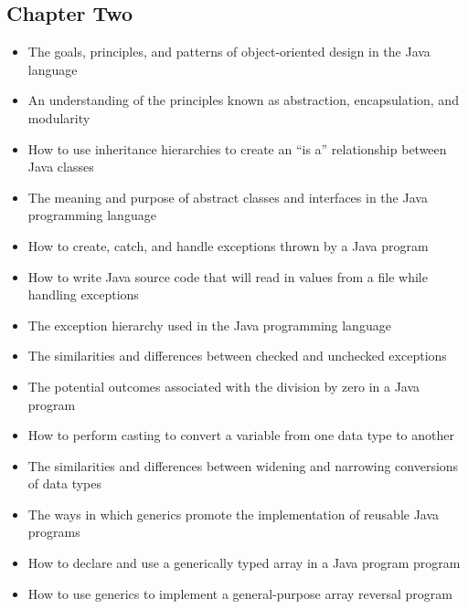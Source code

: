 \documentclass[11pt]{article}
\begin{document}
\vspace*{-.2in}
\subsection*{Chapter Two}

\begin{itemize}

  \item The goals, principles, and patterns of object-oriented design in the
    Java language

  \item An understanding of the principles known as abstraction, encapsulation,
    and modularity

  \item How to use inheritance hierarchies to create an ``is a'' relationship
    between Java classes

  \item The meaning and purpose of abstract classes and interfaces in the Java
    programming language

  \item How to create, catch, and handle exceptions thrown by a Java program

  \item How to write Java source code that will read in values from a file while
    handling exceptions

  \item The exception hierarchy used in the Java programming language

  \item The similarities and differences between checked and unchecked
    exceptions

  \item The potential outcomes associated with the division by zero in a Java
    program

  \item How to perform casting to convert a variable from one data type to
    another

  \item The similarities and differences between widening and narrowing
    conversions of data types

  \item The ways in which generics promote the implementation of reusable Java
    programs

  \item How to declare and use a generically typed array in a Java program
    program

  \item How to use generics to implement a general-purpose array reversal
    program

\end{itemize}
\end{document}
